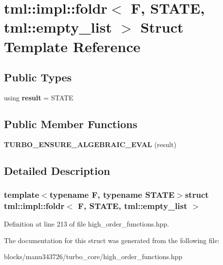 \hypertarget{structtml_1_1impl_1_1foldr_3_01_f_00_01_s_t_a_t_e_00_01tml_1_1empty__list_01_4}{\section{tml\+:\+:impl\+:\+:foldr$<$ F, S\+T\+A\+T\+E, tml\+:\+:empty\+\_\+list $>$ Struct Template Reference}
\label{structtml_1_1impl_1_1foldr_3_01_f_00_01_s_t_a_t_e_00_01tml_1_1empty__list_01_4}
}
\subsection*{Public Types}
\begin{DoxyCompactItemize}
\item 
\hypertarget{structtml_1_1impl_1_1foldr_3_01_f_00_01_s_t_a_t_e_00_01tml_1_1empty__list_01_4_a477f6c3f7c80a88f0e3364f638577504}{using {\bfseries result} = S\+T\+A\+T\+E}\label{structtml_1_1impl_1_1foldr_3_01_f_00_01_s_t_a_t_e_00_01tml_1_1empty__list_01_4_a477f6c3f7c80a88f0e3364f638577504}

\end{DoxyCompactItemize}
\subsection*{Public Member Functions}
\begin{DoxyCompactItemize}
\item 
\hypertarget{structtml_1_1impl_1_1foldr_3_01_f_00_01_s_t_a_t_e_00_01tml_1_1empty__list_01_4_a656440516bbcf75ebfe43c4f731a06cf}{{\bfseries T\+U\+R\+B\+O\+\_\+\+E\+N\+S\+U\+R\+E\+\_\+\+A\+L\+G\+E\+B\+R\+A\+I\+C\+\_\+\+E\+V\+A\+L} (result)}\label{structtml_1_1impl_1_1foldr_3_01_f_00_01_s_t_a_t_e_00_01tml_1_1empty__list_01_4_a656440516bbcf75ebfe43c4f731a06cf}

\end{DoxyCompactItemize}


\subsection{Detailed Description}
\subsubsection*{template$<$typename F, typename S\+T\+A\+T\+E$>$struct tml\+::impl\+::foldr$<$ F, S\+T\+A\+T\+E, tml\+::empty\+\_\+list $>$}



Definition at line 213 of file high\+\_\+order\+\_\+functions.\+hpp.



The documentation for this struct was generated from the following file\+:\begin{DoxyCompactItemize}
\item 
blocks/manu343726/turbo\+\_\+core/high\+\_\+order\+\_\+functions.\+hpp\end{DoxyCompactItemize}
